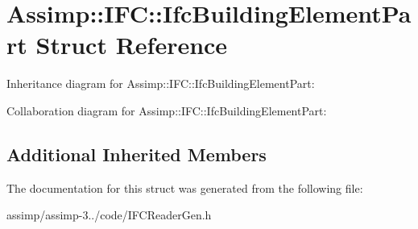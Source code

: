 \hypertarget{struct_assimp_1_1_i_f_c_1_1_ifc_building_element_part}{\section{Assimp\+:\+:I\+F\+C\+:\+:Ifc\+Building\+Element\+Part Struct Reference}
\label{struct_assimp_1_1_i_f_c_1_1_ifc_building_element_part}
}


Inheritance diagram for Assimp\+:\+:I\+F\+C\+:\+:Ifc\+Building\+Element\+Part\+:


Collaboration diagram for Assimp\+:\+:I\+F\+C\+:\+:Ifc\+Building\+Element\+Part\+:
\subsection*{Additional Inherited Members}


The documentation for this struct was generated from the following file\+:\begin{DoxyCompactItemize}
\item 
assimp/assimp-\/3../code/I\+F\+C\+Reader\+Gen.\+h\end{DoxyCompactItemize}
